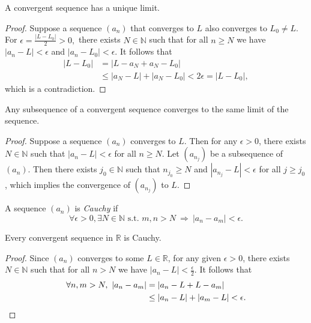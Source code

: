 \begin{lem}
  \label{lem:seqLimitIsUnique}
  A convergent sequence has a unique limit.
\end{lem}
\begin{proof}
  Suppose a sequence $(a_{n})$ that converges to $L$
  also converges to $L_{0}\neq L.$
  For $\epsilon=\frac{|L-L_{0}|}{2}>0,$ there exists $N\in \mathbb{N}$
  such that for all $n\ge N$ we have
  $|a_{n}-L|<\epsilon$ and $|a_{n}-L_{0}|<\epsilon$. It follows that
  \begin{align*}
    |L-L_{0}|&= |L-a_{N}+a_{N}-L_{0}|\\
    &\le |a_{N}-L|+|a_{N}-L_{0}|
    < 2\epsilon = |L-L_{0}|,
  \end{align*}
  which is a contradiction.
\end{proof}

\begin{lem}
  \label{lem:subsequenceInConvergentSequenceIsConvergent}
  Any subsequence of a convergent sequence converges
  to the same limit of the sequence.
\end{lem}
\begin{proof}
  Suppose a sequence $(a_{n})$ converges to $L$.
  Then for any $\epsilon>0$, there exists $N\in \mathbb{N}$ such that
  $|a_{n}-L|<\epsilon$ for all $n\ge N$.
  Let $(a_{n_{j}})$ be a subsequence of $(a_{n})$.
  Then there exists $j_{0}\in \mathbb{N}$
  such that $n_{j_{0}}\ge N$
  and $|a_{n_{j}}-L|<\epsilon$ for all $j\ge j_{0}$,
  which implies the convergence of $(a_{n_{j}})$ to $L$.
\end{proof}

\begin{defn}
  \label{def:CauchySequence}
  A sequence $(a_n)$ is \emph{Cauchy} if
  \begin{equation}
    \label{eq:CauchySequence}
    \forall \epsilon>0, \exists N\in \mathbb{N}
    \text{ s.t. } m,n>N\ \Rightarrow\ |a_n-a_m| < \epsilon.
  \end{equation}
\end{defn}

\begin{lem}
  \label{lem:convergentSeqIsCauchy}
  Every convergent sequence in $\mathbb{R}$
  is Cauchy.
\end{lem}
\begin{proof}
  Since $(a_n)$ converges to some $L\in \mathbb{R}$,
  for any given $\epsilon>0$,
  there exists $N\in \mathbb{N}$ such that
  for all $n>N$ we have $|a_n-L|<\frac{\epsilon}{2}$.
  It follows that
  \begin{align*}
    \forall n,m>N,\  |a_n-a_m|
    &= |a_n-L+L-a_m|
    \\
    &\le |a_n-L| + |a_m-L| < \epsilon.\qedhere
  \end{align*}
\end{proof}

